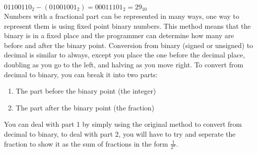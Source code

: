   \noindent
  $ 01100110_2 - (01001001_2) = 00011101_2 = 29_{10} $\\
  Numbers with a fractional part can be represented in many ways, one way to represent them is using fixed point binary numbers. This method means that the binary is in a fixed place and the programmer can determine how many are before and after the binary point. Conversion from binary (signed or unsigned) to decimal is similar to always, except you place the one before the decimal place, doubling as you go to the left, and halving as you move right. To convert from decimal to binary, you can break it into two parts:
  \begin{enumerate}
    \setlength{\itemsep}{0em}
    \item The part before the binary point (the integer)
    \item The part after the binary point (the fraction)
  \end{enumerate}
  You can deal with part 1 by simply using the original method to convert from decimal to binary, to deal with part 2, you will have to try and seperate the fraction to show it as the sum of fractions in the form $ \frac{1}{2^n} $.
  
